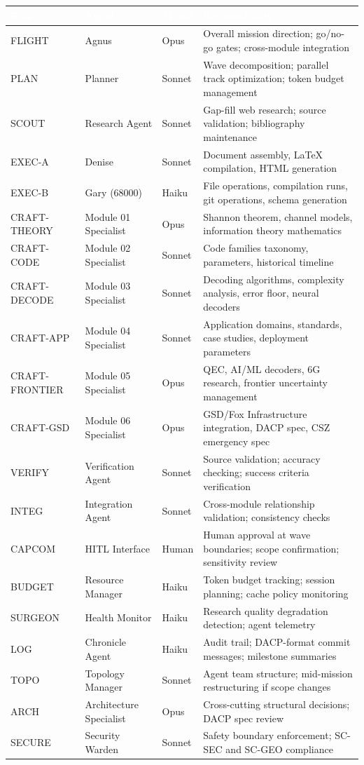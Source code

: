 \documentclass[11pt,letterpaper]{article}
\newcommand{\tableheader}[1]{\textbf{\sffamily\textcolor{white}{#1}}}
\begin{document}
\begin{center}
\begin{tabularx}{\textwidth}{L{2cm}L{3cm}L{2.5cm}X}
\toprule
{}
\tableheader{Role} & \tableheader{Agent} & \tableheader{Model} & \tableheader{Responsibility} \\
\midrule
FLIGHT & Agnus & Opus & Overall mission direction; go/no-go gates; cross-module integration \\
PLAN & Planner & Sonnet & Wave decomposition; parallel track optimization; token budget management \\
SCOUT & Research Agent & Sonnet & Gap-fill web research; source validation; bibliography maintenance \\
EXEC-A & Denise & Sonnet & Document assembly, LaTeX compilation, HTML generation \\
EXEC-B & Gary (68000) & Haiku & File operations, compilation runs, git operations, schema generation \\
CRAFT-THEORY & Module 01 Specialist & Opus & Shannon theorem, channel models, information theory mathematics \\
CRAFT-CODE & Module 02 Specialist & Sonnet & Code families taxonomy, parameters, historical timeline \\
CRAFT-DECODE & Module 03 Specialist & Sonnet & Decoding algorithms, complexity analysis, error floor, neural decoders \\
CRAFT-APP & Module 04 Specialist & Sonnet & Application domains, standards, case studies, deployment parameters \\
CRAFT-FRONTIER & Module 05 Specialist & Opus & QEC, AI/ML decoders, 6G research, frontier uncertainty management \\
CRAFT-GSD & Module 06 Specialist & Opus & GSD/Fox Infrastructure integration, DACP spec, CSZ emergency spec \\
VERIFY & Verification Agent & Sonnet & Source validation; accuracy checking; success criteria verification \\
INTEG & Integration Agent & Sonnet & Cross-module relationship validation; consistency checks \\
CAPCOM & HITL Interface & Human & Human approval at wave boundaries; scope confirmation; sensitivity review \\
BUDGET & Resource Manager & Haiku & Token budget tracking; session planning; cache policy monitoring \\
SURGEON & Health Monitor & Haiku & Research quality degradation detection; agent telemetry \\
LOG & Chronicle Agent & Haiku & Audit trail; DACP-format commit messages; milestone summaries \\
TOPO & Topology Manager & Sonnet & Agent team structure; mid-mission restructuring if scope changes \\
ARCH & Architecture Specialist & Opus & Cross-cutting structural decisions; DACP spec review \\
SECURE & Security Warden & Sonnet & Safety boundary enforcement; SC-SEC and SC-GEO compliance \\
\bottomrule
\end{tabularx}
\end{center}
\end{document}

